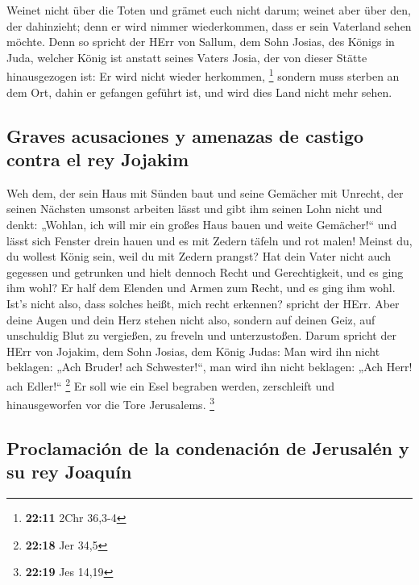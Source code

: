  Weinet nicht über die Toten und grämet euch nicht darum;
weinet aber über den, der dahinzieht; denn er wird nimmer wiederkommen,
dass er sein Vaterland sehen möchte.  Denn so spricht der
HErr von Sallum, dem Sohn Josias, des Königs in Juda, welcher König ist
anstatt seines Vaters Josia, der von dieser Stätte hinausgezogen ist: Er
wird nicht wieder herkommen, \footnote{\textbf{22:11} 2Chr 36,3-4}
 sondern muss sterben an dem Ort, dahin er gefangen
geführt ist, und wird dies Land nicht mehr sehen.

\hypertarget{graves-acusaciones-y-amenazas-de-castigo-contra-el-rey-jojakim}{%
\subsection{Graves acusaciones y amenazas de castigo contra el rey
Jojakim}\label{graves-acusaciones-y-amenazas-de-castigo-contra-el-rey-jojakim}}

 Weh dem, der sein Haus mit Sünden baut und seine
Gemächer mit Unrecht, der seinen Nächsten umsonst arbeiten lässt und
gibt ihm seinen Lohn nicht  und denkt: „Wohlan, ich will
mir ein großes Haus bauen und weite Gemächer!{}`` und lässt sich Fenster
drein hauen und es mit Zedern täfeln und rot malen! 
Meinst du, du wollest König sein, weil du mit Zedern prangst? Hat dein
Vater nicht auch gegessen und getrunken und hielt dennoch Recht und
Gerechtigkeit, und es ging ihm wohl?  Er half dem Elenden
und Armen zum Recht, und es ging ihm wohl. Ist's nicht also, dass
solches heißt, mich recht erkennen? spricht der HErr. 
Aber deine Augen und dein Herz stehen nicht also, sondern auf deinen
Geiz, auf unschuldig Blut zu vergießen, zu freveln und unterzustoßen.
 Darum spricht der HErr von Jojakim, dem Sohn Josias, dem
König Judas: Man wird ihn nicht beklagen: „Ach Bruder! ach
Schwester!{}``, man wird ihn nicht beklagen: „Ach Herr! ach Edler!{}``
\footnote{\textbf{22:18} Jer 34,5}  Er soll wie ein Esel
begraben werden, zerschleift und hinausgeworfen vor die Tore Jerusalems.
\footnote{\textbf{22:19} Jes 14,19}

\hypertarget{proclamaciuxf3n-de-la-condenaciuxf3n-de-jerusaluxe9n-y-su-rey-joaquuxedn}{%
\subsection{Proclamación de la condenación de Jerusalén y su rey
Joaquín}\label{proclamaciuxf3n-de-la-condenaciuxf3n-de-jerusaluxe9n-y-su-rey-joaquuxedn}}

